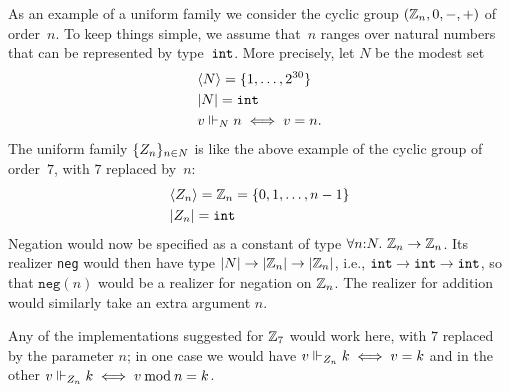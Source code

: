 As an example of a uniform family we consider the cyclic group
$(\mathbb{Z}_n, 0, {-}, {+})$ of order~$n$. To keep things simple, we assume
that~$n$ ranges over natural numbers that can be represented by
type~$\mathtt{int}$. More precisely, let $N$ be the modest set
%
\begin{align*}
  & \langle N \rangle = \{1, \ldots, 2^{30}\} \\
  & |N| = \mathtt{int} \\
  & v \Vdash_N n \iff v = n.
\end{align*}
%
The uniform family $\{Z_n\}_{n \in N}$ is like the above example
of the cyclic group of order~$7$, with $7$ replaced by~$n$:
%
\begin{align*}
  & \langle Z_n \rangle = \mathbb{Z}_n = \{0, 1, \ldots, n - 1\}
  \\
  & |Z_n| = \mathtt{int}
\end{align*}
%
Negation would now be specified as a constant of type
$\forall n{:}N.\ \mathbb{Z}_n\to\mathbb{Z}_n$.  Its realizer \texttt{neg}
would then have type $|N|\to|\mathbb{Z}_n|\to{|\mathbb{Z}_n|}$,
i.e., $\mathtt{int}\to\mathtt{int}\to\mathtt{int}$, so that $\mathtt{neg}(n)$ would
be a realizer for negation on $\mathbb{Z}_n$.   The realizer for addition would
similarly take an extra argument $n$.  

Any of the implementations suggested for $\mathbb{Z}_7$ would work here, with
$7$ replaced by the parameter $n$; in one case we would have
$v \Vdash_{Z_n} k \iff v = k$ and in the other
$v \Vdash_{Z_n} k \iff v \mathbin{\mathrm{mod}} n = k$.

